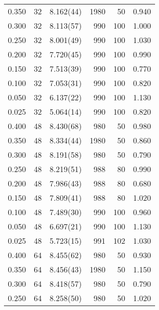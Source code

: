 \begin{tabular}{rrlrrr}
 0.350 &      32 & 8.162(44) &                1980 &                  50 &    0.940 \\
 0.300 &      32 & 8.113(57) &                 990 &                 100 &    1.000 \\
 0.250 &      32 & 8.001(49) &                 990 &                 100 &    1.030 \\
 0.200 &      32 & 7.720(45) &                 990 &                 100 &    0.990 \\
 0.150 &      32 & 7.513(39) &                 990 &                 100 &    0.770 \\
 0.100 &      32 & 7.053(31) &                 990 &                 100 &    0.820 \\
 0.050 &      32 & 6.137(22) &                 990 &                 100 &    1.130 \\
 0.025 &      32 & 5.064(14) &                 990 &                 100 &    0.820 \\
 0.400 &      48 & 8.430(68) &                 980 &                  50 &    0.980 \\
 0.350 &      48 & 8.334(44) &                1980 &                  50 &    0.860 \\
 0.300 &      48 & 8.191(58) &                 980 &                  50 &    0.790 \\
 0.250 &      48 & 8.219(51) &                 988 &                  80 &    0.990 \\
 0.200 &      48 & 7.986(43) &                 988 &                  80 &    0.680 \\
 0.150 &      48 & 7.809(41) &                 988 &                  80 &    1.020 \\
 0.100 &      48 & 7.489(30) &                 990 &                 100 &    0.960 \\
 0.050 &      48 & 6.697(21) &                 990 &                 100 &    1.130 \\
 0.025 &      48 & 5.723(15) &                 991 &                 102 &    1.030 \\
 0.400 &      64 & 8.455(62) &                 980 &                  50 &    0.930 \\
 0.350 &      64 & 8.456(43) &                1980 &                  50 &    1.150 \\
 0.300 &      64 & 8.418(57) &                 980 &                  50 &    0.790 \\
 0.250 &      64 & 8.258(50) &                 980 &                  50 &    1.020 \\

\end{tabular}
